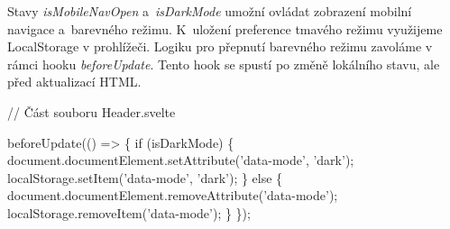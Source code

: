 Stavy \emph{isMobileNavOpen} a~\emph{isDarkMode} umožní ovládat zobrazení mobilní navigace a~barevného režimu. K~uložení preference tmavého režimu využijeme LocalStorage v prohlížeči. 
Logiku pro přepnutí barevného režimu zavoláme v rámci hooku \emph{beforeUpdate}. Tento hook se spustí po změně lokálního stavu, ale před aktualizací HTML.

\begin{prog}
// Část souboru Header.svelte

beforeUpdate(() => \{
  if (isDarkMode) \{
    document.documentElement.setAttribute('data-mode', 'dark');
    localStorage.setItem('data-mode', 'dark');
  \} else \{
    document.documentElement.removeAttribute('data-mode');
    localStorage.removeItem('data-mode');
  \}
\});
\end{prog}